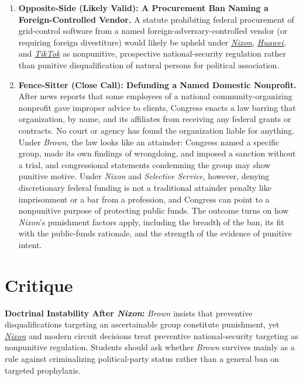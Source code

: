 \documentclass[12pt]{article}
\begin{document}
\begin{enumerate}
\item \textbf{Opposite-Side (Likely Valid): A Procurement Ban Naming a Foreign-Controlled Vendor.} A statute prohibiting federal procurement of grid-control software from a named foreign-adversary-controlled vendor (or requiring foreign divestiture) would likely be upheld under \href{https://supreme.justia.com/cases/federal/us/433/425/}{\textit{Nixon}}, \href{https://law.justia.com/cases/federal/district-courts/texas/txedce/4:2019cv00159/188186/51/}{\textit{Huawei}}, and \href{https://law.justia.com/cases/federal/appellate-courts/cadc/24-1113/24-1113-2024-12-06.html}{\textit{TikTok}} as nonpunitive, prospective national-security regulation rather than punitive disqualification of natural persons for political association.

\item \textbf{Fence-Sitter (Close Call): Defunding a Named Domestic Nonprofit.} After news reports that some employees of a national community-organizing nonprofit gave improper advice to clients, Congress enacts a law barring that organization, by name, and its affiliates from receiving any federal grants or contracts. No court or agency has found the organization liable for anything. Under \textit{Brown}, the law looks like an attainder: Congress named a specific group, made its own findings of wrongdoing, and imposed a sanction without a trial, and congressional statements condemning the group may show punitive motive. Under \textit{Nixon} and \textit{Selective Service}, however, denying discretionary federal funding is not a traditional attainder penalty like imprisonment or a bar from a profession, and Congress can point to a nonpunitive purpose of protecting public funds. The outcome turns on how \textit{Nixon}'s punishment factors apply, including the breadth of the ban, its fit with the public-funds rationale, and the strength of the evidence of punitive intent.

\end{enumerate}

\section{Critique}
\textbf{Doctrinal Instability After \textit{Nixon}:} \textit{Brown} insists that preventive disqualifications targeting an ascertainable group constitute punishment, yet \href{https://supreme.justia.com/cases/federal/us/433/425/}{\textit{Nixon}} and modern circuit decisions treat preventive national-security targeting as nonpunitive regulation. Students should ask whether \textit{Brown} survives mainly as a rule against criminalizing political-party status rather than a general ban on targeted prophylaxis.
\end{document}
